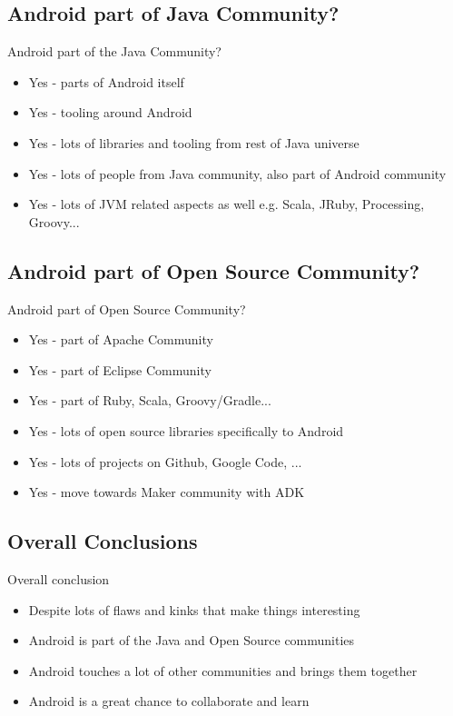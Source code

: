 \documentclass[aspectratio=169]{beamer}
\begin{document}
  \subsection{Android part of Java Community?}
    \begin{frame}{Android part of the Java Community?}
     \begin{itemize}
      \item Yes - parts of Android itself
      \item Yes - tooling around Android
      \item Yes - lots of libraries and tooling from rest of Java universe
      \item Yes - lots of people from Java community, also part of Android community
      \item Yes - lots of JVM related aspects as well e.g. Scala, JRuby, Processing, Groovy...
      \end{itemize}
    \end{frame}
  
  \subsection{Android part of Open Source Community?}
    \begin{frame}{Android part of Open Source Community?}
     \begin{itemize}
      \item Yes - part of Apache Community
      \item Yes - part of Eclipse Community
      \item Yes - part of Ruby, Scala, Groovy/Gradle...
      \item Yes - lots of open source libraries specifically to Android
      \item Yes - lots of projects on Github, Google Code, ...
      \item Yes - move towards Maker community with ADK
     \end{itemize}
    \end{frame}

  \subsection{Overall Conclusions}
    \begin{frame}{Overall conclusion}
      \begin{itemize}
        \item Despite lots of flaws and kinks that make things interesting
        \item Android is part of the Java and Open Source communities
        \item Android touches a lot of other communities and brings them together
        \item Android is a great chance to collaborate and learn
      \end{itemize}
    \end{frame}
\end{document}
